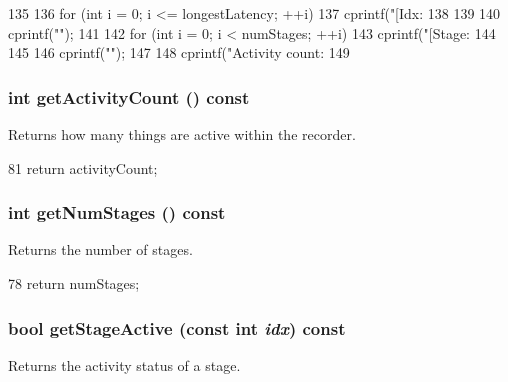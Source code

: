 \begin{DoxyCode}
135 {
136     for (int i = 0; i <= longestLatency; ++i) {
137         cprintf("[Idx:%
138     }
139 
140     cprintf("\n");
141 
142     for (int i = 0; i < numStages; ++i) {
143         cprintf("[Stage:%
144     }
145 
146     cprintf("\n");
147 
148     cprintf("Activity count: %
149 }
\end{DoxyCode}
\hypertarget{classActivityRecorder_a24e9ead78b85428639a9e76329ecd0b7}{
\subsubsection[{getActivityCount}]{\setlength{\rightskip}{0pt plus 5cm}int getActivityCount () const}}
\label{classActivityRecorder_a24e9ead78b85428639a9e76329ecd0b7}
Returns how many things are active within the recorder. 


\begin{DoxyCode}
81 { return activityCount; }
\end{DoxyCode}
\hypertarget{classActivityRecorder_aabc85525e8d2526f4a909313fcb9bfa2}{
\subsubsection[{getNumStages}]{\setlength{\rightskip}{0pt plus 5cm}int getNumStages () const}}
\label{classActivityRecorder_aabc85525e8d2526f4a909313fcb9bfa2}
Returns the number of stages. 


\begin{DoxyCode}
78 { return numStages; }
\end{DoxyCode}
\hypertarget{classActivityRecorder_a918c8f58bd15e33d7d44a37109a868e4}{
\subsubsection[{getStageActive}]{\setlength{\rightskip}{0pt plus 5cm}bool getStageActive (const int {\em idx}) const}}
\label{classActivityRecorder_a918c8f58bd15e33d7d44a37109a868e4}
Returns the activity status of a stage. 


